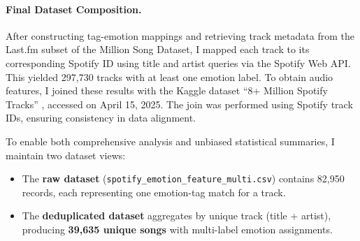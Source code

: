 \documentclass{article}
\begin{document}
\begin{table}[H]
\centering
{}
\caption{Sample entries from the Kaggle \texttt{audio\_features} table.}
\end{table}

\paragraph{Final Dataset Composition.}

After constructing tag-emotion mappings and retrieving track metadata from the Last.fm subset of the Million Song Dataset, I mapped each track to its corresponding Spotify ID using title and artist queries via the Spotify Web API. This yielded 297,730 tracks with at least one emotion label. To obtain audio features, I joined these results with the Kaggle dataset “8+ Million Spotify Tracks” \parencite{GrosseMalte2022}, accessed on April 15, 2025. The join was performed using Spotify track IDs, ensuring consistency in data alignment.

To enable both comprehensive analysis and unbiased statistical summaries, I maintain two dataset views:

\begin{itemize}
    \item The \textbf{raw dataset} (\texttt{spotify\_emotion\_feature\_multi.csv}) contains 82,950 records, each representing one emotion-tag match for a track.
    \item The \textbf{deduplicated dataset} aggregates by unique track (title + artist), producing \textbf{39,635 unique songs} with multi-label emotion assignments.
\end{itemize}
\end{document}
